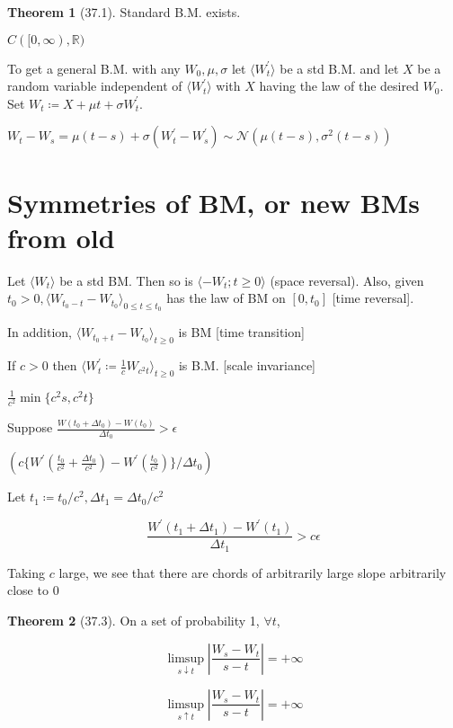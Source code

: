\documentclass{article}
\theoremstyle{definition}
\newtheorem{theorem}{Theorem}
\begin{document}
\begin{theorem}
    [37.1] Standard B.M. exists.
\end{theorem}

\(C([0,\infty),\mathbb{R})\) 

To get a general B.M. with any \(W_0, \mu , \sigma\) let \(\langle W_t^{\prime}  \rangle \) be a std B.M. and let \(X\) be a random variable independent of \(\langle W_t^{\prime}  \rangle \) with \(X\) having the law of the desired \(W_0\). Set \(W_t \coloneqq X + \mu t + \sigma W_t^{\prime} \).

\(W_t - W_s = \mu(t-s) + \sigma(W_t^{\prime} - W_s^{\prime}) \sim \mathcal{N}(\mu(t-s), \sigma ^2(t-s))\) 

\section*{Symmetries of BM, or new BMs from old}

Let \(\langle W_t \rangle \) be a std BM. Then so is \(\langle - W_t ; t \geq 0 \rangle \)  (space reversal). Also, given \(t_0 > 0, \langle W_{t_0 - t} - W_{t_0} \rangle _{0 \leq t \leq t_0}\) has the law of BM on \([0,t_0]\) [time reversal].

In addition, \(\langle W_{t_0 + t} - W_{t_0} \rangle _{t\geq 0}\) is BM [time transition]

If \(c > 0\) then \(\langle W_t^{\prime} \coloneqq \frac{1}{c} W_{c^2 t} \rangle_{t \geq 0} \) is B.M. [scale invariance]

\(\frac{1}{c^2} \min \{ c^2 s, c^2 t \} \) 


Suppose \(\frac{W(t_0 + \Delta t_0)-W(t_0)}{\Delta t_0} > \epsilon\)

\((c \{ W^{\prime} \left( \frac{t_0}{c^2} + \frac{\Delta t_0}{c^2} \right) - W^{\prime} (\frac{t_0}{c^2})  \} / \Delta t_0 )\) 

Let \(t_1 \coloneqq t_0 / c^2, \Delta t_1 = \Delta t_0 / c^2\) 

\[
    \frac{W^{\prime}(t_1 + \Delta t_1) - W^{\prime} (t_1)}{\Delta t_1} > c \epsilon
\]

Taking \(c\) large, we see that there are chords of arbitrarily large slope arbitrarily close to \(0\) 

\begin{theorem}
    [37.3] On a set of probability 1, \(\forall t\),
    
    \[
        \limsup_{s \downarrow t} \left\vert \frac{W_s - W_t}{s-t} \right\vert = + \infty  
    \]

    \[
        \limsup_{s \uparrow t} \left\vert \frac{W_s - W_t}{s-t} \right\vert = + \infty
    \]
\end{theorem}
\end{document}
